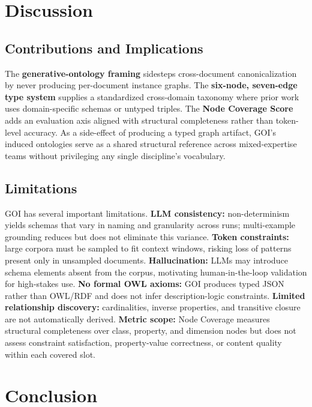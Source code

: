 \documentclass[runningheads,a4paper]{llncs}
\begin{document}
\section{Discussion}
\label{sec:discussion}

\subsection{Contributions and Implications}

The \textbf{generative-ontology framing} sidesteps cross-document
canonicalization by never producing per-document instance graphs.
The \textbf{six-node, seven-edge type system} supplies a
standardized cross-domain taxonomy where prior work uses
domain-specific schemas or untyped triples. The \textbf{Node
Coverage Score} adds an evaluation axis aligned with structural
completeness rather than token-level accuracy. As a side-effect of
producing a typed graph artifact, GOI's induced ontologies serve as a
shared structural reference across mixed-expertise teams without
privileging any single discipline's vocabulary.

\subsection{Limitations}

GOI has several important limitations. \textbf{LLM consistency:}
non-determinism yields schemas that vary in naming and granularity
across runs; multi-example grounding reduces but does not eliminate
this variance. \textbf{Token constraints:} large corpora must be
sampled to fit context windows, risking loss of patterns present
only in unsampled documents. \textbf{Hallucination:} LLMs may
introduce schema elements absent from the corpus, motivating
human-in-the-loop validation for high-stakes use. \textbf{No formal
OWL axioms:} GOI produces typed JSON rather than OWL/RDF and does
not infer description-logic constraints. \textbf{Limited
relationship discovery:} cardinalities, inverse properties, and
transitive closure are not automatically derived. \textbf{Metric
scope:} Node Coverage measures structural completeness over class,
property, and dimension nodes but does not assess constraint
satisfaction, property-value correctness, or content quality within
each covered slot.

\section{Conclusion}
\label{sec:conclusion}
\end{document}
